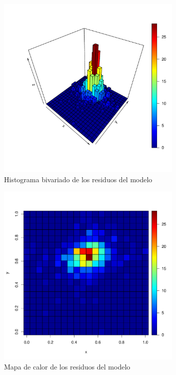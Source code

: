 \documentclass[12pt, twoside]{book}\usepackage[]{graphicx}\usepackage[]{color}
\makeatletter
\newenvironment{kframe}{%
 \def\at@end@of@kframe{}%
 \ifinner\ifhmode%
  \def\at@end@of@kframe{\end{minipage}}%
  \begin{minipage}{\columnwidth}%
 \fi\fi%
 \def\FrameCommand##1{\hskip\@totalleftmargin \hskip-\fboxsep
 \colorbox{shadecolor}{##1}\hskip-\fboxsep
     \hskip-\linewidth \hskip-\@totalleftmargin \hskip\columnwidth}%
 \MakeFramed {\advance\hsize-\width
   \@totalleftmargin\z@ \linewidth\hsize
   \@setminipage}}%
 {\par\unskip\endMakeFramed%
 \at@end@of@kframe}
\newenvironment{knitrout}{}{} %
\numberwithin{equation}{section}
\numberwithin{theorem}{section}
\numberwithin{teorema}{section}
\numberwithin{defi}{section}
\numberwithin{prop}{section}
\numberwithin{defi}{section}
\theoremstyle{plain}
\makeatother
\begin{document}
\begin{knitrout}
\color{fgcolor}\begin{kframe}


{\ttfamily\noindent\bfseries\color{errorcolor}{\#\# Error in residuals(mono\_rest): objeto 'mono\_rest' no encontrado}}\end{kframe}\begin{figure}[H]

{\centering \includegraphics[width=3.5in,height=3.5in]{figure/fig-5_11-1} 

}

\caption[Histograma bivariado de los residuos del modelo]{Histograma bivariado de los residuos del modelo}\label{fig:fig-5.11}
\end{figure}


\end{knitrout}

\begin{knitrout}
\color{fgcolor}\begin{figure}[H]

{\centering \includegraphics[width=3.5in,height=3.5in]{figure/fig-5_12-1} 

}

\caption[Mapa de calor de los residuos del modelo]{Mapa de calor de los residuos del modelo}\label{fig:fig-5.12}
\end{figure}


\end{knitrout}
\end{document}
